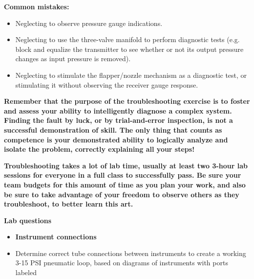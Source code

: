 \vskip 10pt

{\bf Common mistakes:}

\begin{itemize}
\item{} Neglecting to observe pressure gauge indications.
\item{} Neglecting to use the three-valve manifold to perform diagnostic tests (e.g. block and equalize the transmitter to see whether or not its output pressure changes as input pressure is removed).
\item{} Neglecting to stimulate the flapper/nozzle mechanism as a diagnostic test, or stimulating it without observing the receiver gauge response.
\end{itemize}

\vskip 10pt

{\bf Remember that the purpose of the troubleshooting exercise is to foster and assess your ability to intelligently diagnose a complex system.  Finding the fault by luck, or by trial-and-error inspection, is not a successful demonstration of skill.  The only thing that counts as competence is your demonstrated ability to logically analyze and isolate the problem, correctly explaining all your steps!}

\vskip 10pt

{\bf Troubleshooting takes a lot of lab time, usually at least two 3-hour lab sessions for everyone in a full class to successfully pass.  Be sure your team budgets for this amount of time as you plan your work, and also be sure to take advantage of your freedom to observe others as they troubleshoot, to better learn this art.}



\vfil \eject

\noindent
{\bf Lab questions}

\vskip 5pt

\begin{itemize}
\item{} {\bf Instrument connections}
\item{} Determine correct tube connections between instruments to create a working 3-15 PSI pneumatic loop, based on diagrams of instruments with ports labeled
\end{itemize}

\filbreak

